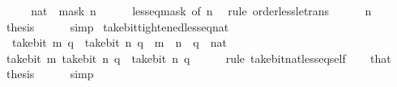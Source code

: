 \begin{isabellebody}
\ \ \isamarkupfalse%
\ \isamarkupfalse%
\ {\isacartoucheopen}{\isacharparenleft}{\kern0pt}{}{\isacharcolon}{\kern0pt}{\isacharcolon}{\kern0pt}nat{\isacharparenright}{\kern0pt}\ {\isacharless}{\kern0pt}\ mask\ n{\isacartoucheclose}\isanewline
\ \ \ \ \isamarkupfalse%
\ less{\isacharunderscore}{\kern0pt}eq{\isacharunderscore}{\kern0pt}mask\ {\isacharbrackleft}{\kern0pt}of\ n{\isacharbrackright}{\kern0pt}\ \isamarkupfalse%
\ {\isacharparenleft}{\kern0pt}rule\ order{\isacharunderscore}{\kern0pt}less{\isacharunderscore}{\kern0pt}le{\isacharunderscore}{\kern0pt}trans{\isacharparenright}{\kern0pt}\isanewline
\ \ \isamarkupfalse%
\ {\isacartoucheopen}{}\ {\isacharless}{\kern0pt}\ n{\isacartoucheclose}\ \isamarkupfalse%
\ {\isacharquery}{\kern0pt}thesis\isanewline
\ \ \ \ \isamarkupfalse%
\ simp\isanewline
{}\isamarkupfalse%
%
\endisatagproof
{\isafoldproof}%
%
\isadelimproof
\isanewline
%
\endisadelimproof
\isanewline
{}\isamarkupfalse%
\ take{\isacharunderscore}{\kern0pt}bit{\isacharunderscore}{\kern0pt}tightened{\isacharunderscore}{\kern0pt}less{\isacharunderscore}{\kern0pt}eq{\isacharunderscore}{\kern0pt}nat{\isacharcolon}{\kern0pt}\isanewline
\ \ {\isacartoucheopen}take{\isacharunderscore}{\kern0pt}bit\ m\ q\ {\isasymle}\ take{\isacharunderscore}{\kern0pt}bit\ n\ q{\isacartoucheclose}\ \ {\isacartoucheopen}m\ {\isasymle}\ n{\isacartoucheclose}\ \ q\ {\isacharcolon}{\kern0pt}{\isacharcolon}{\kern0pt}\ nat\isanewline
%
\isadelimproof
%
\endisadelimproof
%
\isatagproof
{}\isamarkupfalse%
\ {\isacharminus}{\kern0pt}\isanewline
\ \ \isamarkupfalse%
\ {\isacartoucheopen}take{\isacharunderscore}{\kern0pt}bit\ m\ {\isacharparenleft}{\kern0pt}take{\isacharunderscore}{\kern0pt}bit\ n\ q{\isacharparenright}{\kern0pt}\ {\isasymle}\ take{\isacharunderscore}{\kern0pt}bit\ n\ q{\isacartoucheclose}\isanewline
\ \ \ \ \isamarkupfalse%
\ {\isacharparenleft}{\kern0pt}rule\ take{\isacharunderscore}{\kern0pt}bit{\isacharunderscore}{\kern0pt}nat{\isacharunderscore}{\kern0pt}less{\isacharunderscore}{\kern0pt}eq{\isacharunderscore}{\kern0pt}self{\isacharparenright}{\kern0pt}\isanewline
\ \ \isamarkupfalse%
\ that\ \isamarkupfalse%
\ {\isacharquery}{\kern0pt}thesis\isanewline
\ \ \ \ \isamarkupfalse%
\ simp\isanewline
{}\isamarkupfalse%
%
\endisatagproof
{\isafoldproof}%
%
\isadelimproof

\end{isabellebody}
